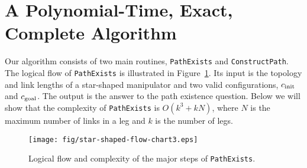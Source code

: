 \documentclass[twocolumn]{IEEEtran}
\begin{document}
%



%

\section{A Polynomial-Time, Exact, Complete Algorithm}
Our algorithm consists of two main routines, {\tt PathExists} and
{\tt ConstructPath}.  The logical flow of {\tt PathExists} is
illustrated in Figure~\ref{PathExists}. Its input is the topology
and link lengths of a star-shaped manipulator and two valid
configurations, $c_{\rm init}$ and $c_{\rm goal}$.  The output is
the answer to the path existence question. Below we will show that
the complexity of {\tt PathExists} is $O(k^3+kN)$, where $N$ is the
maximum number of links in a leg and $k$ is the number of legs.
\begin{figure}
  \centering
  \texttt{[image: fig/star-shaped-flow-chart3.eps]}
  \caption{Logical flow and complexity of the major steps
  of {\tt PathExists}.}
  \label{PathExists}
\end{figure}
\end{document}

